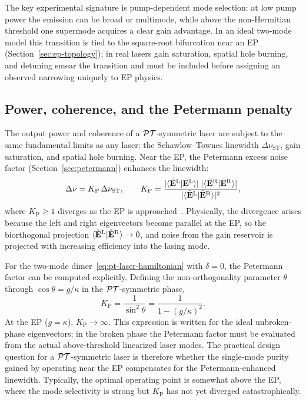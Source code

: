 The key experimental signature is pump-dependent mode selection: at low
pump power the emission can be broad or multimode, while above the
non-Hermitian threshold one supermode acquires a clear gain advantage.
In an ideal two-mode model this transition is tied to the square-root
bifurcation near an EP (Section~\ref{sec:ep-topology}); in real lasers
gain saturation, spatial hole burning, and detuning smear the transition
and must be included before assigning an observed narrowing uniquely to
EP physics.

\subsection{Power, coherence, and the Petermann penalty}
\label{ssec:pt-laser-performance}

The output power and coherence of a $\mathcal{PT}$-symmetric laser are subject to
the same fundamental limits as any laser: the Schawlow--Townes linewidth
$\Delta\nu_{\mathrm{ST}}$, gain saturation, and spatial hole burning.
Near the EP, the Petermann excess noise factor
(Section~\ref{sec:petermann}) enhances the linewidth:
\begin{equation}
 \Delta\nu = K_{\mathrm{P}}\,\Delta\nu_{\mathrm{ST}},
 \qquad
 K_{\mathrm{P}} = \frac{|\langle\tilde{\mathbf{E}}^{\mathrm{L}}|
 \tilde{\mathbf{E}}^{\mathrm{L}}\rangle|\;
 |\langle\tilde{\mathbf{E}}^{\mathrm{R}}|
 \tilde{\mathbf{E}}^{\mathrm{R}}\rangle|}
 {|\langle\tilde{\mathbf{E}}^{\mathrm{L}}|
 \tilde{\mathbf{E}}^{\mathrm{R}}\rangle|^2},
 \label{eq:petermann-linewidth}
\end{equation}
where $K_{\mathrm{P}} \ge 1$ diverges as the EP is
approached~\cite{wang2020petermann}. Physically, the divergence arises
because the left and right eigenvectors become parallel at the EP, so
the biorthogonal projection $\langle\tilde{\mathbf{E}}^{\mathrm{L}}|
\tilde{\mathbf{E}}^{\mathrm{R}}\rangle \to 0$, and noise from the gain
reservoir is projected with increasing efficiency into the lasing mode.

For the two-mode dimer~\eqref{eq:pt-laser-hamiltonian} with $\delta=0$,
the Petermann factor can be computed explicitly. Defining the
non-orthogonality parameter $\theta$ through
$\cos\theta = g/\kappa$ in the $\mathcal{PT}$-symmetric phase,
\begin{equation}
 K_{\mathrm{P}} = \frac{1}{\sin^2\theta}
 = \frac{1}{1 - (g/\kappa)^2}.
 \label{eq:petermann-dimer}
\end{equation}
At the EP ($g = \kappa$), $K_{\mathrm{P}} \to \infty$. This expression
is written for the ideal unbroken-phase eigenvectors; in the broken
phase the Petermann factor must be evaluated from the actual above-threshold
linearized laser modes. The practical
design question for a $\mathcal{PT}$-symmetric laser is therefore whether
the single-mode purity gained by operating near the EP compensates for
the Petermann-enhanced linewidth. Typically, the optimal operating
point is somewhat above the EP, where the mode selectivity is strong
but $K_{\mathrm{P}}$ has not yet diverged catastrophically.

